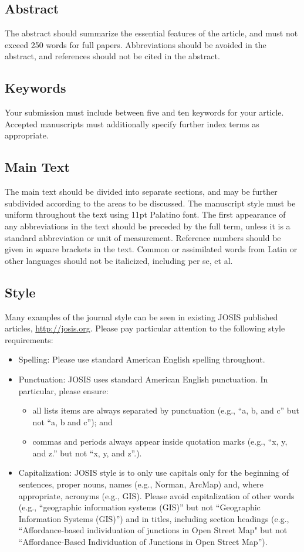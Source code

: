 \documentclass{josis}
\begin{document}
\subsection{Abstract}
The abstract should summarize the essential features of the article, and must not exceed 250 words for full papers. Abbreviations should be avoided in the abstract, and references should not be cited in the abstract.

\subsection{Keywords}
Your submission must include between five and ten keywords for your article. Accepted manuscripts must additionally specify further index terms as appropriate.

\subsection{Main Text}
The main text should be divided into separate sections, and may be further subdivided according to the areas to be discussed. The manuscript style must be uniform throughout the text using 11pt Palatino font. The first appearance of any abbreviations in the text should be preceded by the full term, unless it is a standard abbreviation or unit of measurement. Reference numbers should be given in square brackets in the text. Common or assimilated words from Latin or other languages should not be italicized, including per se, et al.

\subsection{Style}

Many examples of the journal style can be seen in existing JOSIS published articles, \url{http://josis.org}. Please pay particular attention to the following style requirements:

\begin{itemize}
\item Spelling: Please use standard American English spelling throughout.
\item Punctuation: JOSIS uses standard American English punctuation. In
particular, please ensure: 
\begin{itemize}
\item all lists items are always separated by
punctuation (e.g., ``a, b, and c'' but not ``a, b and c''); and 
\item commas and periods always appear inside quotation marks (e.g., ``x, y, and z.'' but not ``x, y, and z''.).
\end{itemize}
\item Capitalization: JOSIS style is to only use capitals only for the
beginning of sentences, proper nouns, names (e.g., Norman, ArcMap) and,
where appropriate, acronyms (e.g., GIS). Please avoid capitalization of
other words (e.g., ``geographic information systems (GIS)'' but not
``Geographic Information Systems (GIS)'') and in titles, including section headings (e.g., ``Affordance-based individuation of junctions in Open Street Map" but not ``Affordance-Based Individuation of Junctions in Open Street Map'').
\end{itemize}
\end{document}
